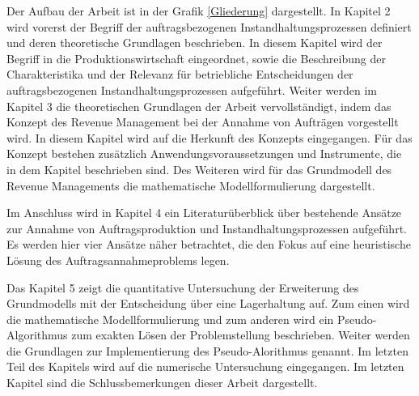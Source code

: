 Der Aufbau der Arbeit ist in der Grafik \ref{Gliederung} dargestellt. In Kapitel 2 wird vorerst der Begriff der auftragsbezogenen Instandhaltungsprozessen definiert und deren theoretische Grundlagen beschrieben. In diesem Kapitel wird der Begriff in die Produktionswirtschaft eingeordnet, sowie die Beschreibung der Charakteristika und der Relevanz für betriebliche Entscheidungen der auftragsbezogenen Instandhaltungsprozessen aufgeführt. Weiter werden im Kapitel 3 die theoretischen Grundlagen der Arbeit vervollständigt, indem das Konzept des Revenue Management bei der Annahme von Aufträgen vorgestellt wird. In diesem Kapitel wird auf die Herkunft des Konzepts eingegangen. Für das Konzept bestehen zusätzlich Anwendungsvoraussetzungen und Instrumente, die in dem Kapitel beschrieben sind. Des Weiteren wird für das Grundmodell des Revenue Managements die mathematische Modellformulierung dargestellt.

Im Anschluss wird in Kapitel 4 ein Literaturüberblick über bestehende Ansätze zur Annahme von Auftragsproduktion und Instandhaltungsprozessen aufgeführt. Es werden hier vier Ansätze näher betrachtet, die den Fokus auf eine heuristische Lösung des Auftragsannahmeproblems legen.

Das Kapitel 5 zeigt die quantitative Untersuchung der Erweiterung des Grundmodells mit der Entscheidung über eine Lagerhaltung auf. Zum einen wird die  mathematische Modellformulierung und zum anderen wird ein Pseudo-Algorithmus zum exakten Lösen der Problemstellung beschrieben. Weiter werden die Grundlagen zur Implementierung des Pseudo-Alorithmus genannt. Im letzten Teil des Kapitels wird auf die numerische Untersuchung eingegangen. Im letzten Kapitel sind die Schlussbemerkungen dieser Arbeit dargestellt. %